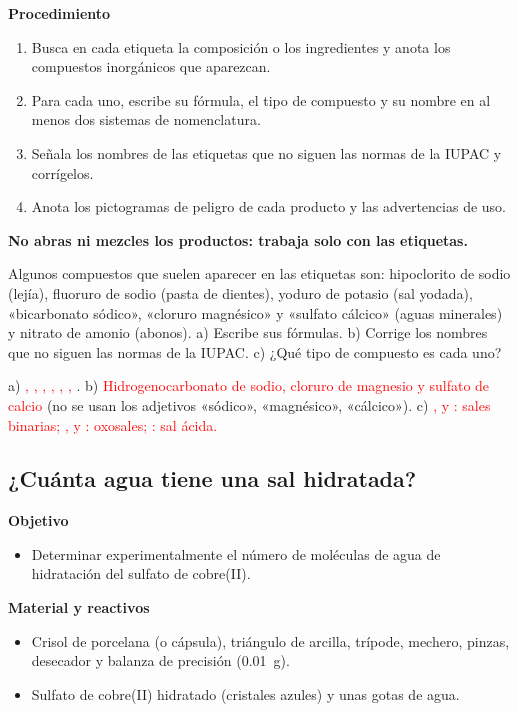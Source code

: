 \textbf{Procedimiento}
\begin{enumerate}[label=\numberballgreen]
    \item Busca en cada etiqueta la composición o los ingredientes y anota los compuestos inorgánicos que aparezcan.
    \item Para cada uno, escribe su fórmula, el tipo de compuesto y su nombre en al menos dos sistemas de nomenclatura.
    \item Señala los nombres de las etiquetas que no siguen las normas de la IUPAC y corrígelos.
    \item Anota los pictogramas de peligro de cada producto y las advertencias de uso.
\end{enumerate}
\textbf{No abras ni mezcles los productos: trabaja solo con las etiquetas.}

\begin{exercise}
    Algunos compuestos que suelen aparecer en las etiquetas son: hipoclorito de sodio (lejía), fluoruro de sodio (pasta de
    dientes), yoduro de potasio (sal yodada), «bicarbonato sódico», «cloruro magnésico» y «sulfato cálcico» (aguas minerales) y
    nitrato de amonio (abonos). a) Escribe sus fórmulas. b) Corrige los nombres que no siguen las normas de la IUPAC. c) ¿Qué tipo
    de compuesto es cada uno?
    \begin{solu}
        a) \textcolor{red}{, , , , , , }. b)
        \textcolor{red}{Hidrogenocarbonato de sodio, cloruro de magnesio y sulfato de calcio} (no se usan los adjetivos
        «sódico», «magnésico», «cálcico»). c) \textcolor{red}{,  y : sales binarias; ,
         y : oxosales; : sal ácida.}
    \end{solu}
\end{exercise}

\subsection{¿Cuánta agua tiene una sal hidratada?}

\noindent\begin{minipage}[t]{0.48\textwidth}
    \textbf{Objetivo}
    \begin{itemize}
        \item Determinar experimentalmente el número de moléculas de agua de hidratación del sulfato de cobre(II).
    \end{itemize}
\end{minipage}\hfill
\begin{minipage}[t]{0.48\textwidth}
    \textbf{Material y reactivos}
    \begin{itemize}
        \item Crisol de porcelana (o cápsula), triángulo de arcilla, trípode, mechero, pinzas, desecador y balanza de
        precisión (\qty{0.01}{\gram}).
        \item Sulfato de cobre(II) hidratado (cristales azules) y unas gotas de agua.
    \end{itemize}
\end{minipage}

